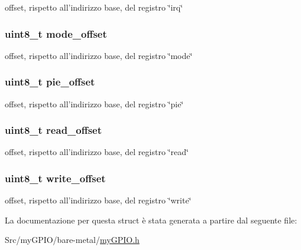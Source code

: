 offset, rispetto all'indirizzo base, del registro \char`\"{}irq\char`\"{} \hypertarget{structmy_g_p_i_o__t_ad21272e5293d7c1e7ccafe35a2e129d1}{
\subsubsection[{mode\+\_\+offset}]{\setlength{\rightskip}{0pt plus 5cm}uint8\+\_\+t mode\+\_\+offset}}\label{structmy_g_p_i_o__t_ad21272e5293d7c1e7ccafe35a2e129d1}
offset, rispetto all'indirizzo base, del registro \char`\"{}mode\char`\"{} \hypertarget{structmy_g_p_i_o__t_ae5f1d610c87917b9dd6fbb5af534faf0}{
\subsubsection[{pie\+\_\+offset}]{\setlength{\rightskip}{0pt plus 5cm}uint8\+\_\+t pie\+\_\+offset}}\label{structmy_g_p_i_o__t_ae5f1d610c87917b9dd6fbb5af534faf0}
offset, rispetto all'indirizzo base, del registro \char`\"{}pie\char`\"{} \hypertarget{structmy_g_p_i_o__t_ab65acde67dc46f1d163e2ee468420b48}{
\subsubsection[{read\+\_\+offset}]{\setlength{\rightskip}{0pt plus 5cm}uint8\+\_\+t read\+\_\+offset}}\label{structmy_g_p_i_o__t_ab65acde67dc46f1d163e2ee468420b48}
offset, rispetto all'indirizzo base, del registro \char`\"{}read\char`\"{} \hypertarget{structmy_g_p_i_o__t_abb65e5db6d4ad365a7c48d00e4af1f78}{
\subsubsection[{write\+\_\+offset}]{\setlength{\rightskip}{0pt plus 5cm}uint8\+\_\+t write\+\_\+offset}}\label{structmy_g_p_i_o__t_abb65e5db6d4ad365a7c48d00e4af1f78}
offset, rispetto all'indirizzo base, del registro \char`\"{}write\char`\"{} 

La documentazione per questa struct è stata generata a partire dal seguente file\+:\begin{DoxyCompactItemize}
\item 
Src/my\+G\+P\+I\+O/bare-\/metal/\hyperlink{my_g_p_i_o_8h}{my\+G\+P\+I\+O.\+h}\end{DoxyCompactItemize}

